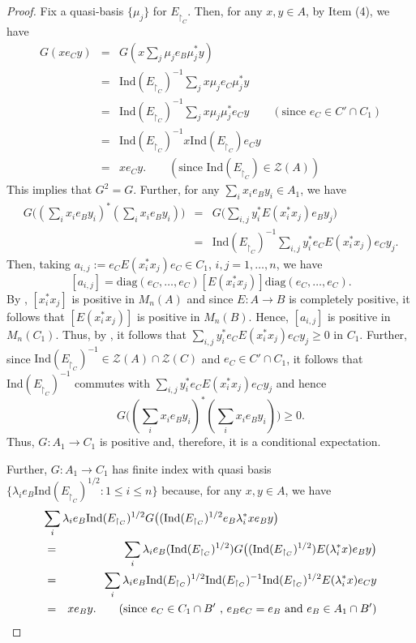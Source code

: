 \documentclass[a4]{amsart}
\numberwithin{equation}{section}
\begin{document}
\begin{proof}
Fix a quasi-basis $\{\mu_j\}$ for $E_{\restriction_C}$. Then,  for
any $x,y \in A$, by Item (4), we have
\begin{eqnarray*}
  G(xe_Cy) & = & G(x \sum_j \mu_j e_B \mu_j^* y)\\ & = &
  \mathrm{Ind}(E_{\restriction_{C}})^{-1} \sum_j x \mu_j e_C \mu_j^*
  y\\ & = & \mathrm{Ind}(E_{\restriction_{C}})^{-1} \sum_j x \mu_j
  \mu_j^* e_C y\qquad (\text{since } e_C \in C'\cap C_1) \\ & = &
  \mathrm{Ind}(E_{\restriction_{C}})^{-1} x
  \mathrm{Ind}(E_{\restriction_{C}}) e_C y\\ & = & xe_Cy. \qquad
  (\text{since } \mathrm{Ind}(E_{\restriction_{C}}) \in
  \mathcal{Z}(A))
\end{eqnarray*}
This implies that $G^2 = G$.  Further, for any $\sum_i x_i e_B y_i \in
A_1$, we have
\begin{eqnarray*}
 G\big((\sum_{i} x_i e_B y_i)^* (\sum_{i} x_i e_B y_i)\big)&=& G\big(\sum_{i,j} y_i^* E(x_i^* x_j)e_B y_j\big)\\
 &=& \mathrm{Ind}(E_{\restriction_{C}})^{-1} \sum_{i,j} y_i^* e_CE(x_i^* x_j) e_C y_j.
 \end{eqnarray*}
Then, taking $a_{i,j} := e_C E(x_i^*x_j) e_C\in C_1$, $i, j = 1, \ldots , n$, we  have
  \[
[a_{i,j}]= \mathrm{diag}(e_C, \ldots, e_C)[E(x_i^* x_j)]
\mathrm{diag}(e_C, \dots, e_C).
\]
By \cite[Lemma 3.1]{Tak1}, $[x_i^*x_j]$ is positive in $M_n(A)$ and
since $E:A \to B$ is completely positive, it follows that
$[E(x_i^*x_j)]$ is positive in $M_n(B)$. Hence, $[a_{i,j}]$ is positive
in $M_n(C_1)$. Thus, by \cite[Lemma 3.2]{Tak1}, it follows that
$\sum_{i,j} y_i^* e_CE(x_i^* x_j) e_C y_j \geq 0$ in $C_1$. Further,
since ${\mathrm{Ind}(E_{\restriction_C})}^{-1} \in \mathcal{Z}(A)\cap
  \mathcal{Z}(C)$ and $e_C \in C'\cap C_1$, it follows that
  ${\mathrm{Ind}(E_{\restriction_C})}^{-1}$ commutes with $\sum_{i,j} y_i^* e_CE(x_i^* x_j) e_C y_j$ and hence
  \[
 G\big((\sum_{i} x_i e_B y_i)^* (\sum_{i} x_i e_B y_i)\big) \geq 0.
 \]
Thus,  $G: A_1 \to C_1$ is positive and, therefore, it is a conditional expectation.

 Further, $ G : A_1 \to C_1$ has finite index with quasi basis $\{\lambda_i e_B
\mathrm{Ind}(E_{\restriction_{C}})^{1/2} : 1\leq i \leq n\}$ because,	for any $x, y \in A$, we have
	\begin{eqnarray*}
	  \lefteqn{\sum_{i} \lambda_i e_B\mathrm{Ind}(E_{\restriction_{C}})^{1/2}G\big((\mathrm{Ind}(E_{\restriction_{C}})^{1/2} e_B \lambda_i^* x e_B y\big)}\\
          & = & \sum_{i} \lambda_i e_B(\mathrm{Ind}(E_{\restriction_{C}})^{1/2})G\big((\mathrm{Ind}(E_{\restriction_{C}})^{1/2}) E(\lambda_i^* x) e_B y\big)\\
		&=& \sum_{i} \lambda_i e_B\mathrm{Ind}(E_{\restriction_{C}})^{1/2} \mathrm{Ind}(E_{\restriction_{C}})^{-1} \mathrm{Ind}(E_{\restriction_{C}})^{1/2} E(\lambda_i^* x) e_C y\\
		& =& xe_By. \qquad \text{(since $e_C \in C_1 \cap B'$ , $e_B e_C = e_B$ and $e_B \in A_1 \cap B'$)}
	\end{eqnarray*}


\end{proof}
\end{document}
